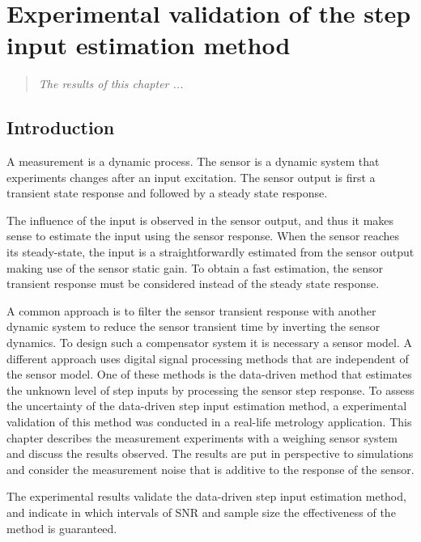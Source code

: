 \glsresetall

\chapter{Experimental validation of the step input estimation method }\label{chap:ExperimentalValidation}

\begin{quote}
\emph{The results of this chapter ...}\vfill{}
\end{quote}

 
 \section{Introduction}

A measurement is a dynamic process. 
The sensor is a dynamic system that experiments changes after an input excitation.
The sensor output is first a transient state response and followed by a steady state response.

The influence of the input is observed in the sensor output, and thus it makes sense to estimate the input using the sensor response.
When the sensor reaches its steady-state, the input is a straightforwardly estimated from the sensor output making use of the sensor static gain.
To obtain a fast estimation, the sensor transient response must be considered instead of the steady state response.

A common approach is to filter the sensor transient response with another dynamic system to reduce the sensor transient time by inverting the sensor dynamics.
To design such a compensator system it is necessary a sensor model.
A different approach uses digital signal processing methods that are independent of the sensor model.
One of these methods is the data-driven method that estimates the unknown level of step inputs by processing the sensor step response. 
To assess the uncertainty of the data-driven step input estimation method, a experimental validation of this method was conducted in a real-life metrology application. 
This chapter describes the measurement experiments with a weighing sensor system and discuss the results observed.
The results are put in perspective to simulations and consider the measurement noise that is additive to the response of the sensor. 

The experimental results validate the data-driven step input estimation method, and indicate in which intervals of SNR and sample size the effectiveness of the method is guaranteed.

